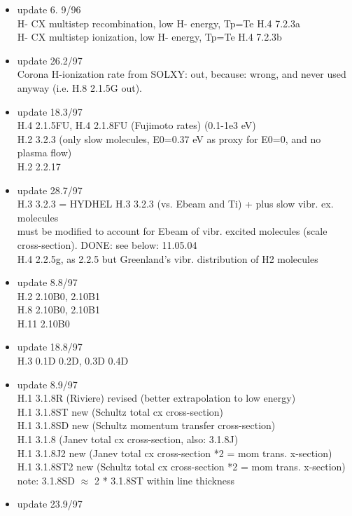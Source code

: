 \documentclass[12pt,dvipdfmx]{article}
\begin{document}
\begin{itemize}
 \item update   6. 9/96 \\
   H- CX multistep recombination, low H- energy, Tp=Te H.4  7.2.3a\\
   H- CX multistep ionization, low H- energy, Tp=Te H.4  7.2.3b
 \item update   26.2/97 \\
   Corona H-ionization rate from SOLXY: out, because:
   wrong, and never used anyway
(i.e. H.8 2.1.5G out).
 \item update   18.3/97 \\
  H.4 2.1.5FU, H.4 2.1.8FU (Fujimoto rates) (0.1-1e3 eV)\\
  H.2 3.2.3  (only slow molecules, E0=0.37 eV as proxy for E0=0, and no plasma flow) \\
  H.2 2.2.17
 \item update   28.7/97 \\
  H.3 3.2.3  = HYDHEL H.3 3.2.3 (vs. Ebeam and Ti) + plus
  slow vibr. ex. molecules\\
  must be modified to account for Ebeam of vibr. excited
  molecules (scale cross-section). DONE: see below: 11.05.04\\
  H.4 2.2.5g, as 2.2.5 but Greenland's vibr. distribution of H2 molecules
 \item update    8.8/97 \\
  H.2 2.10B0, 2.10B1 \\
  H.8 2.10B0, 2.10B1 \\
  H.11 2.10B0
 \item update   18.8/97 \\
  H.3 0.1D  0.2D, 0.3D 0.4D \\
 \item update    8.9/97 \\
  H.1 3.1.8R (Riviere) revised (better extrapolation to low energy) \\
  H.1 3.1.8ST new (Schultz total cx cross-section) \\
  H.1 3.1.8SD new (Schultz momentum transfer cross-section) \\
  H.1 3.1.8       (Janev total cx cross-section, also: 3.1.8J)\\
  H.1 3.1.8J2 new (Janev total cx cross-section *2 = mom trans. x-section)\\
  H.1 3.1.8ST2 new (Schultz total cx cross-section *2 = mom trans. x-section)\\
  note: 3.1.8SD $\approx$ 2  * 3.1.8ST within line thickness
 \item update   23.9/97 \\

\end{itemize}
\end{document}
